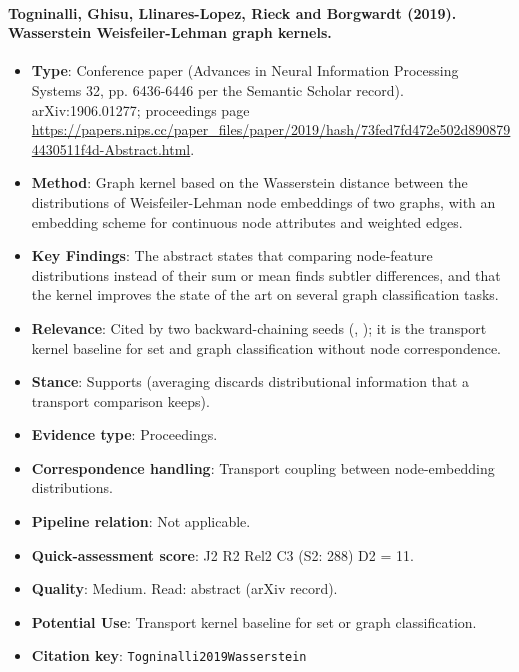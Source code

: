 \documentclass[journal,onecolumn]{IEEEtran}
\begin{document}
\paragraph{Togninalli, Ghisu, Llinares-Lopez, Rieck and Borgwardt (2019). Wasserstein Weisfeiler-Lehman graph kernels.~\cite{Togninalli2019Wasserstein}}\mbox{}

\begin{itemize}

\item{} \textbf{Type}: Conference paper (Advances in Neural Information Processing Systems 32, pp. 6436-6446 per the Semantic Scholar record). arXiv:1906.01277; proceedings page \url{https://papers.nips.cc/paper_files/paper/2019/hash/73fed7fd472e502d8908794430511f4d-Abstract.html}.

\item{} \textbf{Method}: Graph kernel based on the Wasserstein distance between the distributions of Weisfeiler-Lehman node embeddings of two graphs, with an embedding scheme for continuous node attributes and weighted edges.

\item{} \textbf{Key Findings}: The abstract states that comparing node-feature distributions instead of their sum or mean finds subtler differences, and that the kernel improves the state of the art on several graph classification tasks.

\item{} \textbf{Relevance}: Cited by two backward-chaining seeds (\cite{Mialon2021Trainable}, \cite{VincentCuaz2022Template}); it is the transport kernel baseline for set and graph classification without node correspondence.

\item{} \textbf{Stance}: Supports (averaging discards distributional information that a transport comparison keeps).

\item{} \textbf{Evidence type}: Proceedings.

\item{} \textbf{Correspondence handling}: Transport coupling between node-embedding distributions.

\item{} \textbf{Pipeline relation}: Not applicable.

\item{} \textbf{Quick-assessment score}: J2 R2 Rel2 C3 (S2: 288) D2 = 11.

\item{} \textbf{Quality}: Medium. Read: abstract (arXiv record).

\item{} \textbf{Potential Use}: Transport kernel baseline for set or graph classification.

\item{} \textbf{Citation key}: \texttt{Togninalli2019Wasserstein}

\end{itemize}
\end{document}
